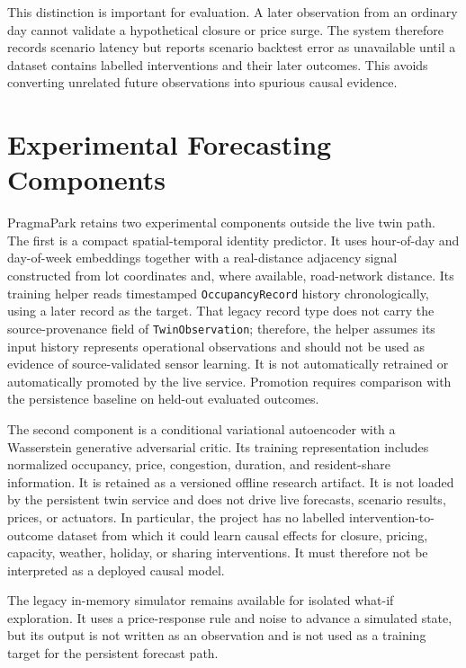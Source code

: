 \documentclass[conference]{IEEEtran}
\begin{document}
This distinction is important for evaluation. A later observation from an ordinary day cannot validate a hypothetical closure or price surge. The system therefore records scenario latency but reports scenario backtest error as unavailable until a dataset contains labelled interventions and their later outcomes. This avoids converting unrelated future observations into spurious causal evidence.

\section{Experimental Forecasting Components}

PragmaPark retains two experimental components outside the live twin path. The first is a compact spatial-temporal identity predictor. It uses hour-of-day and day-of-week embeddings together with a real-distance adjacency signal constructed from lot coordinates and, where available, road-network distance. Its training helper reads timestamped \texttt{OccupancyRecord} history chronologically, using a later record as the target. That legacy record type does not carry the source-provenance field of \texttt{TwinObservation}; therefore, the helper assumes its input history represents operational observations and should not be used as evidence of source-validated sensor learning. It is not automatically retrained or automatically promoted by the live service. Promotion requires comparison with the persistence baseline on held-out evaluated outcomes.

The second component is a conditional variational autoencoder with a Wasserstein generative adversarial critic. Its training representation includes normalized occupancy, price, congestion, duration, and resident-share information. It is retained as a versioned offline research artifact. It is not loaded by the persistent twin service and does not drive live forecasts, scenario results, prices, or actuators. In particular, the project has no labelled intervention-to-outcome dataset from which it could learn causal effects for closure, pricing, capacity, weather, holiday, or sharing interventions. It must therefore not be interpreted as a deployed causal model.

The legacy in-memory simulator remains available for isolated what-if exploration. It uses a price-response rule and noise to advance a simulated state, but its output is not written as an observation and is not used as a training target for the persistent forecast path.
\end{document}
